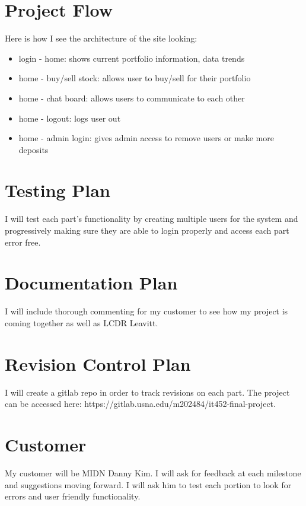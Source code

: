 \documentclass{article}
\begin{document}
\section{Project Flow}
Here is how I see the architecture of the site looking:
\begin{itemize}
    \item login - home: shows current portfolio information, data trends
    \item home - buy/sell stock: allows user to buy/sell for their portfolio
    \item home - chat board: allows users to communicate to each other
    \item home - logout: logs user out
    \item home - admin login: gives admin access to remove users or make more deposits
\end{itemize}
\section{Testing Plan}
I will test each part's functionality by creating multiple users for the system and progressively making sure they are able to login properly and access each part error free.
\section{Documentation Plan}
I will include thorough commenting for my customer to see how my project is coming together as well as LCDR Leavitt.

\section{Revision Control Plan}
I will create a gitlab repo in order to track revisions on each part. The project can be accessed here: https://gitlab.usna.edu/m202484/it452-final-project. 
\section{Customer}
My customer will be MIDN Danny Kim. I will ask for feedback at each milestone and suggestions moving forward. I will ask him to test each portion to look for errors and user friendly functionality.
\end{document}
